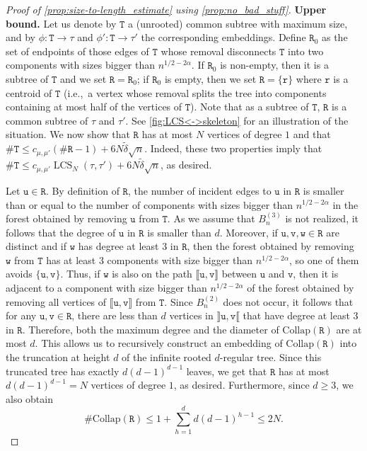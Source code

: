 \documentclass[11pt,reqno]{amsart}
\newcommand{\1}{\mathbf{1}}
\newcommand{\0}{\mathbf{0}}
\newcommand{\ttT}{\mathtt{T}}
\newcommand{\ttR}{\mathtt{R}}
\newcommand{\ttr}{\mathtt{r}}
\newcommand{\ttu}{\mathtt{u}}
\newcommand{\ttv}{\mathtt{v}}
\newcommand{\ttw}{\mathtt{w}}
\newcommand{\LCS}{\operatorname{LCS}}
\begin{document}
\begin{proof}[Proof of \cref{prop:size-to-length_estimate} using \cref{prop:no_bad_stuff}]
\medskip
\noindent \textbf{Upper bound.}
Let us denote by $\ttT$ a (unrooted) common subtree with maximum size, and by $\phi:\ttT\rightarrow \tau$ and $\phi':\ttT\rightarrow \tau'$ the corresponding embeddings. Define $\ttR_0$ as the set of endpoints of those edges of $\ttT$ whose removal disconnects $\ttT$ into two components with sizes bigger than $n^{1/2-2\alpha}$. If $\ttR_0$ is non-empty, then it is a subtree of $\ttT$ and we set $\ttR=\ttR_0$; if $\ttR_0$ is empty, then we set $\ttR=\{\ttr\}$ where $\ttr$ is a centroid of $\ttT$ (i.e.,~a vertex whose removal splits the tree into components containing at most half of the vertices of $\ttT$).
Note that as a subtree of $\ttT$, $\ttR$ is a common subtree of $\tau$ and $\tau'$. See \cref{fig:LCS<->skeleton} for an illustration of the situation. We now show that $\ttR$ has at most $N$ vertices of degree $1$ and that $\#\ttT\leq c_{\mu,\mu'}(\#\ttR-1) +6N\tilde{\delta}\sqrt{n}$. Indeed, these two properties imply that $\#\ttT\leq c_{\mu,\mu'}\LCS_N(\tau,\tau')+6N\tilde{\delta}\sqrt{n}$, as desired.

\medskip
Let $\ttu\in\ttR$. By definition of $\ttR$, the number of incident edges to $\ttu$ in $\ttR$ is smaller than or equal to the number of components with sizes bigger than $n^{1/2-2\alpha}$ in the forest obtained by removing $\ttu$ from $\ttT$. As we assume that $B_n^{(3)}$ is not realized, it follows that the degree of $\ttu$ in $\ttR$ is smaller than $d$. 
Moreover, if $\ttu,\ttv,\ttw\in\ttR$ are distinct and if $\ttw$ has degree at least $3$ in $\ttR$, then the forest obtained by removing $\ttw$ from $\ttT$ has at least $3$ components with size bigger than $n^{1/2-2\alpha}$, so one of them avoids $\{\ttu,\ttv\}$. Thus, if $\ttw$ is also on the path $\llbracket \ttu,\ttv\rrbracket$ between $\ttu$ and $\ttv$, then it is adjacent to a component with size bigger than $n^{1/2-2\alpha}$ of the forest obtained by removing all vertices of $\llbracket \ttu,\ttv\rrbracket$ from $\ttT$. Since $B_n^{(2)}$ does not occur, it follows that for any $\ttu,\ttv\in\ttR$, there are less than $d$ vertices in $\rrbracket\ttu,\ttv\llbracket$ that have degree at least $3$ in $\ttR$. 
Therefore, both the maximum degree and the diameter of $\mathrm{Collap}(\ttR)$ are at most $d$. This allows us to recursively construct an embedding of $\mathrm{Collap}(\ttR)$ into the truncation at height $d$ of the infinite rooted $d$-regular tree. Since this truncated tree has exactly $d(d-1)^{d-1}$ leaves, we get that $\ttR$ has at most $d(d-1)^{d-1}=N$ vertices of degree $1$, as desired. Furthermore, since $d\geq 3$, we also obtain
\begin{equation}
\label{size_combinatorial_skeleton}
\#\mathrm{Collap}(\ttR)\leq 1+\sum_{h=1}^d d(d-1)^{h-1}\leq 2N.
\end{equation}



\end{proof}
\end{document}
